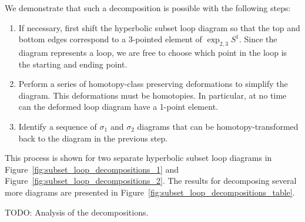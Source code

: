 \documentclass[12pt,twoside]{reedthesis}
\theoremstyle{definition}
\newcommand{\TODO}[1]{{\color{todopink}\textsf{TODO: #1}}}
\begin{document}
We demonstrate that such a decomposition is possible with the following steps:
\begin{enumerate}[1.]
  \item If necessary, first shift the hyperbolic subset loop diagram so that the top and bottom edges correspond to a 3-pointed element of $\exp_{2,3} S^1$.
  Since the diagram represents a loop, we are free to choose which point in the loop is the starting and ending point.

  \item Perform a series of homotopy-class preserving deformations to simplify the diagram.
  This deformations must be homotopies. In particular, at no time can the deformed loop diagram have a 1-point element. 

  \item Identify a sequence of $\sigma_1$ and $\sigma_2$ diagrams that can be homotopy-transformed back to the diagram in the previous step.
\end{enumerate}

This process is shown for two separate hyperbolic subset loop diagrams in Figure~\ref{fig:subset_loop_decompositions_1} and Figure~\ref{fig:subset_loop_decompositions_2}.
The results for decomposing several more diagrams are presented in Figure~\ref{fig:subset_loop_decompositions_table}.

\TODO{Analysis of the decompositions.}
\end{document}
